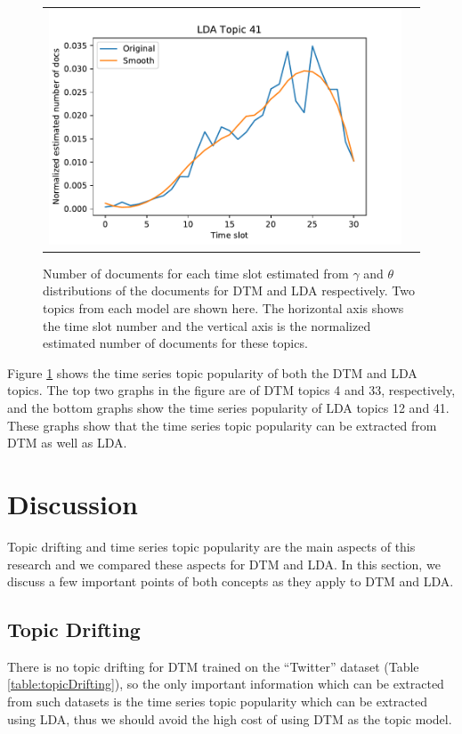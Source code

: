 \documentclass[a4paper]{report}
\begin{document}
\begin{figure}[h!]
\begin{center}
\begin{tabular}{cc}
\includegraphics[scale=.5]{LDApopulationTopic41.pdf}
\end{tabular}
\caption{Number of documents for each time slot estimated from $\gamma$ and $\theta$ distributions of the documents for DTM and LDA respectively. Two topics from each model are shown here. The horizontal axis shows the time slot number and the vertical axis is the normalized estimated number of documents for these topics.}
\label{fig:populationGraphs}
\end{center}
\end{figure}


Figure \ref{fig:populationGraphs} shows the time series topic popularity of both the DTM and LDA topics. The top two graphs in the figure are of DTM topics 4 and 33, respectively, and the bottom graphs show the time series popularity of LDA topics 12 and 41. These graphs show that the time series topic popularity can be extracted from DTM as well as LDA.


\chapter{Discussion}
 Topic drifting and time series topic popularity are the main aspects of this research and we compared these aspects for DTM and LDA. In this section, we discuss a few important points of both concepts as they apply to DTM and LDA.

\section{Topic Drifting}
There is no topic drifting for DTM trained on the ``Twitter'' dataset ({Table \ref{table:topicDrifting}}), so the only important information which can be extracted from such datasets is the time series topic popularity which can be extracted using LDA, thus we should avoid the high cost of using DTM as the topic model.  
\end{document}
